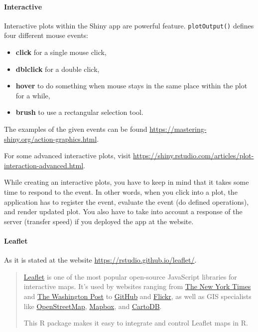 \documentclass[
]{article}
\providecommand{\tightlist}{%
  \setlength{\itemsep}{0pt}\setlength{\parskip}{0pt}}
\begin{document}
\hypertarget{interactive}{%
\paragraph{Interactive}\label{interactive}}

Interactive plots within the Shiny app are powerful feature.
\texttt{plotOutput()} defines four different mouse events:

\begin{itemize}
\tightlist
\item
  \textbf{click} for a single mouse click,
\item
  \textbf{dblclick} for a double click,
\item
  \textbf{hover} to do something when mouse stays in the same place
  within the plot for a while,
\item
  \textbf{brush} to use a rectangular selection tool.
\end{itemize}

The examples of the given events can be found
\url{https://mastering-shiny.org/action-graphics.html}.

For some advanced interactive plots, visit
\url{https://shiny.rstudio.com/articles/plot-interaction-advanced.html}.

While creating an interactive plots, you have to keep in mind that it
takes some time to respond to the event. In other words, when you click
into a plot, the application has to register the event, evaluate the
event (do defined operations), and render updated plot. You also have to
take into account a response of the server (transfer speed) if you
deployed the app at the website.

\hypertarget{leaflet}{%
\paragraph{Leaflet}\label{leaflet}}

As it is stated at the website \url{https://rstudio.github.io/leaflet/}.

\begin{quote}
\href{https://leafletjs.com}{Leaflet} is one of the most popular
open-source JavaScript libraries for interactive maps. It's used by
websites ranging from
\href{http://www.nytimes.com/projects/elections/2013/nyc-primary/mayor/map.html}{The
New York Times} and
\href{http://www.washingtonpost.com/sf/local/2013/11/09/washington-a-world-apart/}{The
Washington Post} to
\href{https://github.com/blog/1528-there-s-a-map-for-that}{GitHub} and
\href{https://www.flickr.com/map}{Flickr}, as well as GIS specialists
like \href{http://www.openstreetmap.org/}{OpenStreetMap},
\href{http://www.mapbox.com/}{Mapbox}, and
\href{http://cartodb.com/}{CartoDB}.

This R package makes it easy to integrate and control Leaflet maps in R.
\end{quote}
\end{document}
